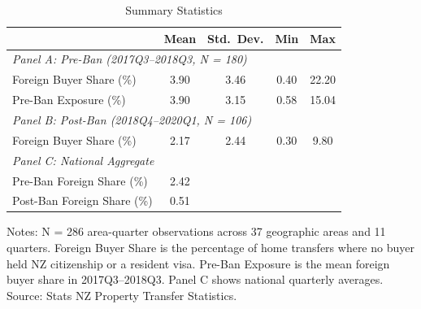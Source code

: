 \begin{table}[H]
\centering
\caption{Summary Statistics}
\begin{threeparttable}
\begin{tabular}{lcccc}
\toprule
& Mean & Std.\ Dev. & Min & Max \\
\midrule
\multicolumn{5}{l}{\textit{Panel A: Pre-Ban (2017Q3--2018Q3, N = 180)}} \\[3pt]
Foreign Buyer Share (\%) & 3.90 & 3.46 & 0.40 & 22.20 \\
Pre-Ban Exposure (\%) & 3.90 & 3.15 & 0.58 & 15.04 \\[6pt]
\multicolumn{5}{l}{\textit{Panel B: Post-Ban (2018Q4--2020Q1, N = 106)}} \\[3pt]
Foreign Buyer Share (\%) & 2.17 & 2.44 & 0.30 & 9.80 \\[6pt]
\multicolumn{5}{l}{\textit{Panel C: National Aggregate}} \\[3pt]
Pre-Ban Foreign Share (\%) & 2.42 & & & \\
Post-Ban Foreign Share (\%) & 0.51 & & & \\
\bottomrule
\end{tabular}
\begin{tablenotes}[flushleft]
\small
\item Notes: N = 286 area-quarter observations across 37 geographic areas and 11 quarters. Foreign Buyer Share is the percentage of home transfers where no buyer held NZ citizenship or a resident visa. Pre-Ban Exposure is the mean foreign buyer share in 2017Q3--2018Q3. Panel C shows national quarterly averages. Source: Stats NZ Property Transfer Statistics.
\end{tablenotes}
\end{threeparttable}
\label{tab:summary}
\end{table}
